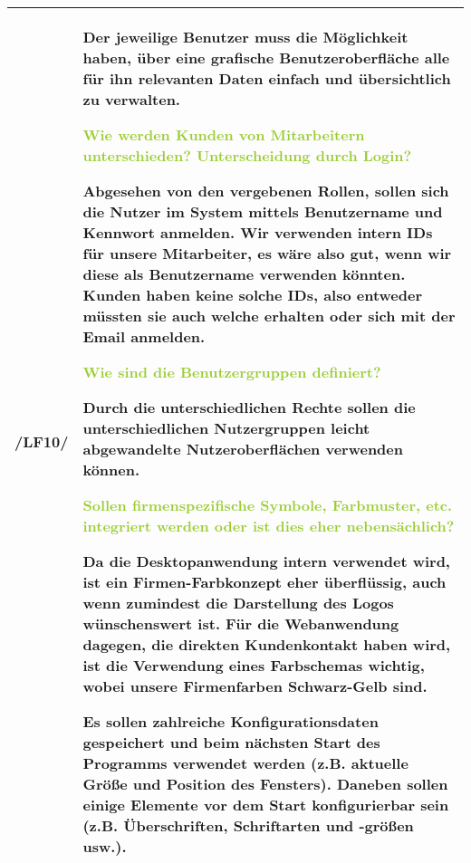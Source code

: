 \begin{tabular}{l | p{13cm}}
    \hline
    /LF10/ & Der jeweilige Benutzer muss die Möglichkeit haben, über eine grafische Benutzeroberfläche alle für ihn relevanten Daten einfach und übersichtlich zu verwalten. 

    \textcolor{YellowGreen}{Wie werden Kunden von Mitarbeitern unterschieden? Unterscheidung durch Login?}

    \textcolor{NavyBlue}{Abgesehen von den vergebenen Rollen, sollen sich die Nutzer im System mittels Benutzername und Kennwort anmelden. Wir verwenden intern IDs für unsere Mitarbeiter, es wäre also gut, wenn wir diese als Benutzername verwenden könnten. Kunden haben keine solche IDs, also entweder müssten sie auch welche erhalten oder sich mit der Email anmelden.}

    \textcolor{YellowGreen}{Wie sind die Benutzergruppen definiert?}

    \textcolor{NavyBlue}{Durch die unterschiedlichen Rechte sollen die unterschiedlichen Nutzergruppen leicht abgewandelte Nutzeroberflächen verwenden können.}

    \textcolor{YellowGreen}{Sollen firmenspezifische Symbole, Farbmuster, etc. integriert werden oder ist dies eher nebensächlich?}

    \textcolor{NavyBlue}{Da die Desktopanwendung intern verwendet wird, ist ein Firmen-Farbkonzept eher überflüssig, auch wenn zumindest die Darstellung des Logos wünschenswert ist. Für die Webanwendung dagegen, die direkten Kundenkontakt haben wird, ist die Verwendung eines Farbschemas wichtig, wobei unsere Firmenfarben Schwarz-Gelb sind.}

    Es sollen zahlreiche Konfigurationsdaten gespeichert und beim nächsten Start des Programms verwendet werden (z.B. aktuelle Größe und Position des Fensters). Daneben sollen einige Elemente vor dem Start konfigurierbar sein (z.B. Überschriften, Schriftarten und -größen usw.). \\
    \hline
    
\end{tabular}

